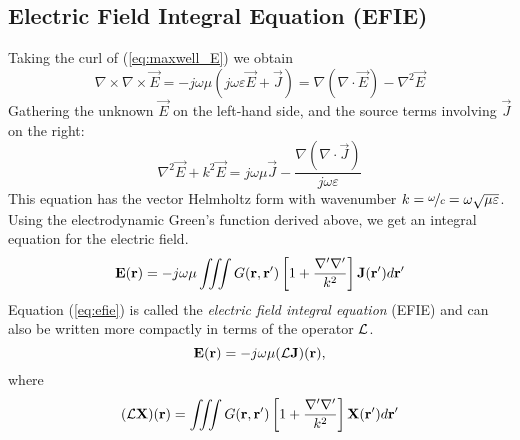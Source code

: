 \subsection{Electric Field Integral Equation (EFIE)}
\label{sec:em_efie}
Taking the curl of (\ref{eq:maxwell_E}) we obtain
\begin{equation*}
	\nabla \times \nabla \times \vec{E}  = -j\omega\mu (j\omega\varepsilon \vec{E} + \vec{J}) = \nabla (\nabla \cdot \vec{E}) - \nabla^2 \vec{E}
\end{equation*}
Gathering the unknown $\vec{E}$ on the left-hand side, and the source terms involving $\vec{J}$ on the right:
\begin{equation}
	\nabla^2 \vec{E} + k^2 \vec{E} = j\omega\mu\vec{J} - \frac{\nabla (\nabla \cdot \vec{J})}{j\omega\varepsilon}
\end{equation}
This equation has the vector Helmholtz form with wavenumber $k = \nicefrac{\omega}{c} = \omega \sqrt{\mu \varepsilon}$. Using the electrodynamic Green's function derived above, we get an integral equation for the electric field.
\begin{equation}
	\mathbf{E}(\mathbf{r}) = -j\omega\mu \iiint G(\mathbf{r}, \mathbf{r}^\prime) \left[ 1 + \frac
	{\nabla^\prime \nabla^\prime}{k^2} \right] \mathbf{J}(\mathbf{r}^\prime) d\mathbf{r}^\prime
	\label{eq:efie}
\end{equation}
Equation (\ref{eq:efie}) is called the \emph{electric field integral equation} (EFIE) and can also be written more compactly in terms of the operator $\mathcal{L}$.
\begin{equation}
	\mathbf{E}(\mathbf{r}) = -j\omega\mu (\mathcal{L} \mathbf{J})(\mathbf{r}),
\end{equation}
where
\begin{equation}
	(\mathcal{L}\mathbf{X})(\mathbf{r}) = \iiint G(\mathbf{r}, \mathbf{r}^\prime) \left[ 1 + \frac{\nabla^\prime \nabla^\prime}{k^2} \right] \mathbf{X}(\mathbf{r}^\prime) d\mathbf{r}^\prime
\end{equation}
